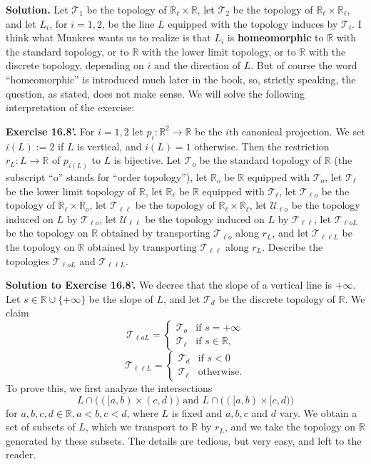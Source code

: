 \documentclass[12pt,letterpaper]{article}
\newcommand{\mc}{\mathcal}
\newcommand{\noi}{\noindent}%
\newcommand{\R}{\mathbb R}
\newcommand{\T}{\mathcal T}
\begin{document}
\noi\textbf{Solution.} Let $\T_1$ be the topology of $\R_\ell\times\R$, let $\T_2$ be the topology of $\R_\ell\times\R_\ell$, and let $L_i$, for $i=1,2$, be the line $L$ equipped with the topology induces by $\T_i$. I think what Munkres wants us to realize is that $L_i$ is \textbf{homeomorphic} to $\R$ with the standard topology, or to $\R$ with the lower limit topology, or to $\R$ with the discrete topology, depending on $i$ and the direction of $L$. But of course the word ``homeomorphic'' is introduced much later in the book, so, strictly speaking, the question, as stated, does not make sense. We will solve the following interpretation of the exercise: 

\noi\textbf{Exercise 16.8'.} For $i=1,2$ let $p_i:\R^2\to\R$ be the $i$th canonical projection. We set $i(L):=2$ if $L$ is vertical, and $i(L)=1$ otherwise. Then the restriction $r_L:L\to\R$ of $p_{i(L)}$ to $L$ is bijective. Let $\T_o$ be the standard topology of $\R$ (the subscript ``o'' stands for ``order topology''), let $\R_o$ be $\R$ equipped with $\T_o$, let $\T_\ell$ be the lower limit topology of $\R$, let $\R_\ell$ be $\R$ equipped with $\T_\ell$, let $\T_{\ell o}$ be the topology of $\R_\ell\times\R_o$, let $\T_{\ell\ell}$ be the topology of $\R_\ell\times\R_\ell$, let $\mc U_{\ell o}$ be the topology induced on $L$ by $\T_{\ell o}$, let $\mc U_{\ell\ell}$ be the topology induced on $L$ by $\T_{\ell\ell}$, let $\T_{\ell oL}$ be the topology on $\R$ obtained by transporting $\T_{\ell o}$ along $r_L$, and let $\T_{\ell\ell L}$ be the topology on $\R$ obtained by transporting $\T_{\ell\ell}$ along $r_L$. Describe the topologies $\T_{\ell oL}$ and $\T_{\ell\ell L}$. 

\noi\textbf{Solution to Exercise 16.8'.} We decree that the slope of a vertical line is $+\infty$. Let $s\in\R\cup\{+\infty\}$ be the slope of $L$, and let $\T_d$ be the discrete topology of $\R$. We claim 
$$
\T_{\ell oL}=
\begin{cases}
\T_o&\text{if }s=+\infty\\ 
\T_\ell&\text{if }s\in\R,
\end{cases}
$$ 
$$
\T_{\ell\ell L}=
\begin{cases}
\T_d&\text{if }s<0\\ 
\T_\ell&\text{otherwise.}
\end{cases}
$$ 
To prove this, we first analyze the intersections 
$$
L\cap\big(([a,b)\times(c,d)\big)\text{ and }L\cap\big(([a,b)\times[c,d)\big)
$$ 
for $a,b,c,d\in\R,a<b,c<d$, where $L$ is fixed and $a,b,c$ and $d$ vary. We obtain a set of subsets of $L$, which we transport to $\R$ by $r_L$, and we take the topology on $\R$ generated by these subsets. The details are tedious, but very easy, and left to the reader. 
\end{document}
